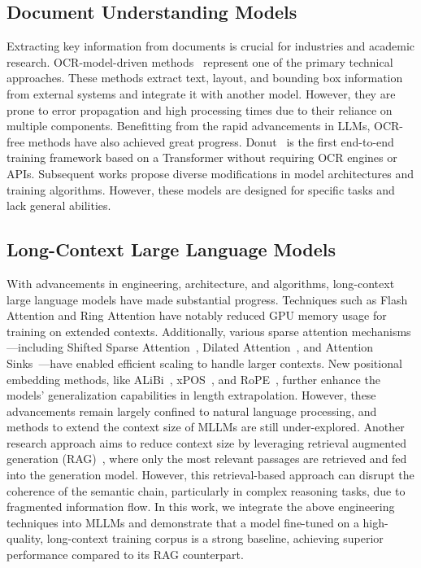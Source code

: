 \documentclass[10pt,twocolumn,letterpaper]{article}
\begin{document}
\begin{CJK}{UTF8}{gbsn}
\subsection{Document Understanding Models}

Extracting key information from documents is crucial for industries and academic research.
OCR-model-driven methods~\cite{wang2023docllm,appalaraju2024docformerv2,bai2022wukong,tang2023unifying} represent one of the primary technical approaches. These methods extract text, layout, and bounding box information from external systems and integrate it with another model. However, they are prone to error propagation and high processing times due to their reliance on multiple components.
Benefitting from the rapid advancements in LLMs, OCR-free methods have also achieved great progress. Donut~\cite{kim2022ocr} is the first end-to-end training framework based on a Transformer without requiring OCR engines or APIs. 
Subsequent works \cite{wang2023towards,feng2023docpedia,ye2023ureader,wei2023vary,luo2024layoutllm} propose diverse modifications in model architectures and training algorithms.
However, these models are designed for specific tasks and lack general abilities.


\subsection{Long-Context Large Language Models}

With advancements in engineering, architecture, and algorithms, long-context large language models have made substantial progress. Techniques such as Flash Attention \cite{dao2022flashattention,dao2023flashattention} and Ring Attention \cite{liu2023ring} have notably reduced GPU memory usage for training on extended contexts. Additionally, various sparse attention mechanisms—including Shifted Sparse Attention~\cite{chen2023longlora}, Dilated Attention~\cite{ding2023longnet}, and Attention Sinks~\cite{han2023lm,xiao2023efficient}—have enabled efficient scaling to handle larger contexts. 
New positional embedding methods, like ALiBi~\cite{press2021train}, xPOS~\cite{sun2022length}, and RoPE~\cite{su2024roformer}, further enhance the models’ generalization capabilities in length extrapolation.
However, these advancements remain largely confined to natural language processing, and methods to extend the context size of MLLMs are still under-explored.
Another research approach aims to reduce context size by leveraging retrieval augmented generation (RAG)~\cite{yu2024visrag,faysse2024colpali, cho2024m3docrag}, where only the most relevant passages are retrieved and fed into the generation model. However, this retrieval-based approach can disrupt the coherence of the semantic chain, particularly in complex reasoning tasks, due to fragmented information flow.
In this work, we integrate the above engineering techniques into MLLMs and demonstrate that a model fine-tuned on a high-quality, long-context training corpus is a strong baseline, achieving superior performance compared to its RAG counterpart.



\end{CJK}
\end{document}

